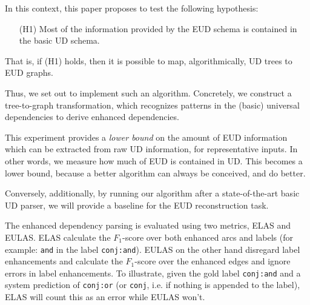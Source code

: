 \documentclass[11pt,a4paper]{article}
\begin{document}
In this context, this paper proposes to test the following hypothesis:
\begin{enumerate}
\item[(H1)] Most of the information provided by the EUD schema is
  contained in the basic UD schema.
\end{enumerate}

That is, if (H1) holds, then it is possible to map, algorithmically,
UD trees to EUD graphs.

Thus, we set out to implement such an algorithm. Concretely, we construct  a
tree-to-graph transformation, which recognizes patterns in the (basic)
universal dependencies to derive enhanced dependencies.
%


This experiment provides a \emph{lower bound} on the amount of EUD
information which can be extracted from raw UD information, for
representative inputs.  In other words, we measure how much of EUD is
contained in UD. This becomes a lower bound, because a better algorithm
can always be conceived, and do better.


Conversely, additionally, by running our algorithm after a
state-of-the-art basic UD parser, we will provide a baseline for the
EUD reconstruction task.
%
%

The enhanced dependency parsing is evaluated using two metrics,
ELAS and EULAS. ELAS calculate the $F_1$-score over both enhanced
arcs and labels (for example: \texttt{and} in the label
\texttt{conj:and}). EULAS on the other hand disregard label
enhancements and calculate the $F_1$-score over the enhanced
edges and ignore errors in label enhancements. To illustrate,
given the gold label \texttt{conj:and} and a system prediction of
\texttt{conj:or} (or \texttt{conj}, i.e. if nothing is appended
to the label), ELAS will count this as an error while EULAS
won't.

\end{document}
